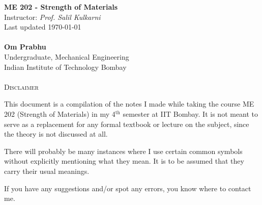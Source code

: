 \documentclass[11pt]{article}
\theoremstyle{definition}
\begin{document}
\begin{center}
{\LARGE \bf ME 202 - Strength of Materials}\\
{Instructor: \textit{Prof. Salil Kulkarni}}\\
Last updated \today \\~\\
{\large \bf Om Prabhu}\\
Undergraduate, Mechanical Engineering\\
Indian Institute of Technology Bombay\\~\\
\textsc{Disclaimer}
\end{center}
\vspace{-6pt}

This document is a compilation of the notes I made while taking the course ME 202 (Strength of Materials) in my 4$^{\text{th}}$ semester at IIT Bombay. It is not meant to serve as a replacement for any formal textbook or lecture on the subject, since the theory is not discussed at all.

There will probably be many instances where I use certain common symbols without explicitly mentioning what they mean. It is to be assumed that they carry their usual meanings.

If you have any suggestions and/or spot any errors, you know where to contact me.

\hrulefill
\tableofcontents
\hrulefill
\pagebreak
\end{document}
